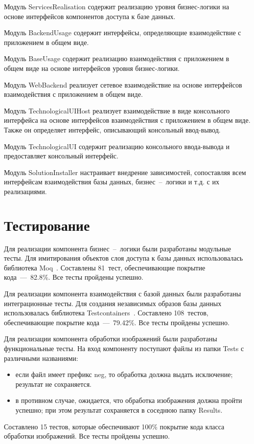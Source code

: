 Модуль ServicesRealisation содержит реализацию уровня бизнес-логики на основе интерфейсов компонентов доступа к базе данных.

Модуль BackendUsage содержит интерфейсы, определяющие взаимодействие с приложением в общем виде.

Модуль BaseUsage содержит реализацию взаимодействия с приложением в общем виде на основе интерфейсов уровня бизнес-логики.

Модуль WebBackend реализует сетевое взаимодействие на основе интерфейсов взаимодействия с приложением в общем виде.

Модуль TechnologicalUIHost реализует взаимодействие в виде консольного интерфейса на основе интерфейсов взаимодействия с приложением в общем виде. Также он определяет интерфейс, описывающий консольный ввод-вывод.

Модуль TechnologicalUI содержит реализацию консольного ввода-вывода и предоставляет  консольный интерфейс.

Модуль SolutionInstaller настраивает внедрение зависимостей, сопоставляя всем интерфейсам взаимодействия базы данных, бизнес~--~логики и т.д. с их реализациями.

\section{Тестирование}

Для реализации компонента бизнес~--~логики были разработаны модульные тесты. Для имитирования объектов слоя доступа к базы данных использовалась библиотека Moq~\cite{moq}. Составлены 81~тест, обеспечивающие покрытие кода~---~82.8\%. Все тесты пройдены успешно.

Для реализации компонента взаимодействия с базой данных были разработаны интеграционные тесты. Для создания независимых образов базы данных использовалась библиотека Testcontainers~\cite{testcontainers}. Составлено 108~тестов, обеспечивающие покрытие кода~---~79.42\%. Все тесты пройдены успешно.

Для реализации компонента обработки изображений были разработаны функциональные тесты. На вход компоненту поступают файлы из папки Tests с различными названиями:
\begin{itemize}
	\item если файл имеет префикс neg, то обработка должна выдать исключение; результат не сохраняется.
	\item в противном случае, ожидается, что обработка изображения должна пройти успешно; при этом результат сохраняется в соседнюю папку Results.
\end{itemize}
Составлено 15 тестов, которые обеспечивают 100\% покрытие кода класса обработки изображений. Все тесты пройдены успешно.

